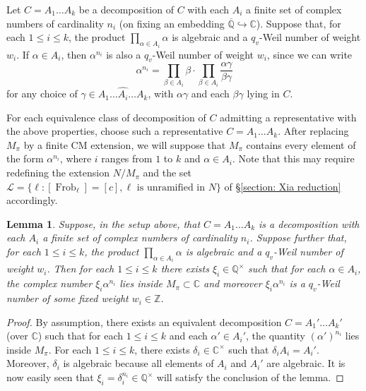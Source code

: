 \documentclass{amsart}
\newtheorem{lemma}[theorem]{Lemma}
\theoremstyle{definition}
\numberwithin{equation}{section} %
\newcommand{\Frob}{\operatorname{Frob}}
\newcommand{\bb}[1]{\mathbb{#1}}
\newcommand{\ol}[1]{\overline{#1}}
\begin{document}
Let $C = A_1 \ldots A_k$ be a decomposition of $C$ with each $A_i$ a finite set of complex numbers of cardinality $n_i$ (on fixing an embedding $\ol{\bb{Q}} \hookrightarrow \bb{C}$).
Suppose that, for each $1 \leq i \leq k$, the product $\prod_{\alpha \in A_i} \alpha$ is algebraic and a $q_v$-Weil number of weight $w_i$.
If $\alpha \in A_i$, then $\alpha^{n_i}$ is also a $q_v$-Weil number of weight $w_i$,
since we can write \[\alpha^{n_i} = \prod_{\beta \in A_i} \beta \cdot \prod_{\beta \in A_i} \frac{\alpha \gamma}{\beta \gamma}\] for any choice of $\gamma \in A_1 \ldots \hat{A_i} \ldots A_k$, with $\alpha \gamma$ and each $\beta \gamma$ lying in $C$.

For each equivalence class of decomposition of $C$ admitting a representative with the above properties, choose such a representative $C = A_1 \ldots A_k$.
After replacing $M_\pi$ by a finite CM extension, we will suppose that $M_\pi$ contains every element of the form $\alpha^{n_i}$, where $i$ ranges from $1$ to $k$ and $\alpha \in A_i$.
Note that this may require redefining the extension $N/M_\pi$ and the set $\mathcal{L} = \{\ell: [\Frob_\ell] = [c], \ell \text{ is unramified in } N \}$ of \S \ref{section: Xia reduction} accordingly.

\begin{lemma} \label{lemma: existence of xi_i}
Suppose, in the setup above, that $C = A_1 \ldots A_k$ is a decomposition with each $A_i$ a finite set of complex numbers of cardinality $n_i$.
Suppose further that, for each $1 \leq i \leq k$, the product $\prod_{\alpha \in A_i} \alpha$ is algebraic and a $q_v$-Weil number of weight $w_i$.
Then for each $1 \leq i \leq k$ there exists $\xi_i \in \bb{Q}^\times$ such that for each $\alpha \in A_i$, the complex number $\xi_i \alpha^{n_i}$ lies inside $M_\pi \subset \bb{C}$ and moreover $\xi_i \alpha^{n_i}$ is a $q_v$-Weil number of some fixed weight $w_i \in \bb{Z}$.
\end{lemma}
\begin{proof}
By assumption, there exists an equivalent decomposition $C = A_1' \ldots A_k'$ (over $\bb{C}$) such that for each $1 \leq i \leq k$ and each $\alpha' \in A_i'$, the quantity $(\alpha')^{n_i}$ lies inside $M_\pi$.
For each $1 \leq i \leq k$, there exists $\delta_i \in \bb{C}^\times$ such that $\delta_i A_i = A_i'$.
Moreover, $\delta_i$ is algebraic because all elements of $A_i$ and $A_i'$ are algebraic.
It is now easily seen that $\xi_i = \delta_i^{n_i} \in \bb{Q}^\times$ will satisfy the conclusion of the lemma.
\end{proof}
\end{document}
